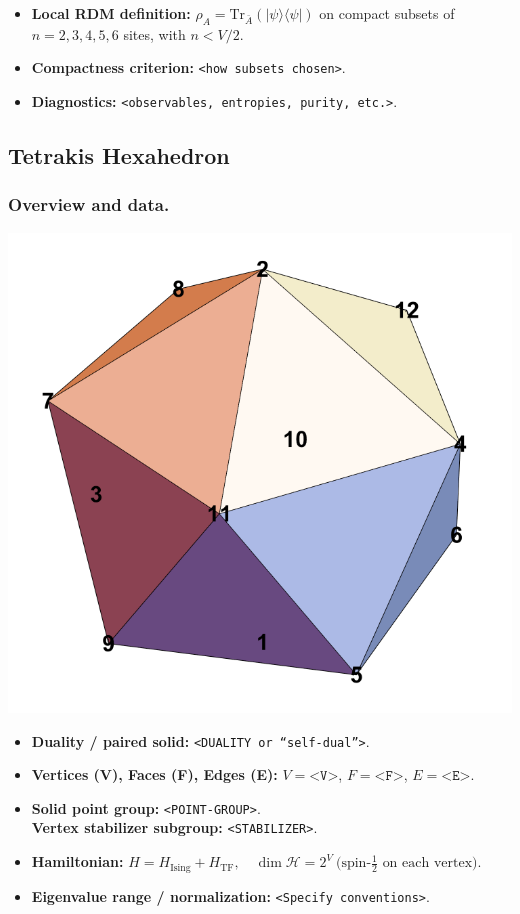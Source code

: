 \documentclass[11pt,a4paper]{article}
\newcommand{\Hising}{H_{\mathrm{Ising}}}
\newcommand{\Htf}{H_{\mathrm{TF}}}
\newcommand{\Htot}{H=\Hising+\Htf}
\begin{document}
\begin{itemize}[leftmargin=1.5em]
  \item \textbf{Local RDM definition:} $\rho_A=\mathrm{Tr}_{\bar A}(|\psi\rangle\langle\psi|)$ on compact subsets of $n=2,3,4,5,6$ sites, with $n < V/2$.
  \item \textbf{Compactness criterion:} \texttt{<how subsets chosen>}.
  \item \textbf{Diagnostics:} \texttt{<observables, entropies, purity, etc.>}.
\end{itemize}


\subsection*{Tetrakis Hexahedron}

\subsubsection*{Overview and data.}
\begin{center}
  \includegraphics[width=.6\linewidth]{icosahedron}
\end{center}

\begin{itemize}[leftmargin=1.5em]
  \item \textbf{Duality / paired solid:} \texttt{<DUALITY or “self-dual”>}.
  \item \textbf{Vertices (V), Faces (F), Edges (E):} $V=\texttt{<V>}$,\; $F=\texttt{<F>}$,\; $E=\texttt{<E>}$.
  \item \textbf{Solid point group:} \texttt{<POINT-GROUP>}.\\
        \textbf{Vertex stabilizer subgroup:} \texttt{<STABILIZER>}.
  \item \textbf{Hamiltonian:} \(
        \Htot,\quad
        \dim\mathcal{H} = 2^{V}\ \text{(spin-$\tfrac12$ on each vertex).}
        \)
  \item \textbf{Eigenvalue range / normalization:} \texttt{<Specify conventions>}.
\end{itemize}
\end{document}
